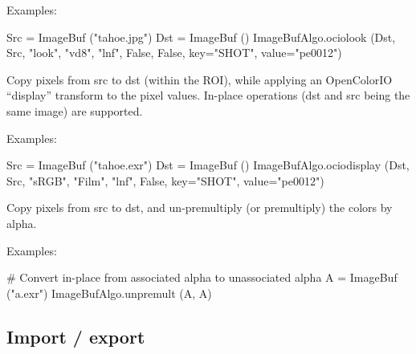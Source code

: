 \smallskip
\noindent Examples:
\begin{code}
    Src = ImageBuf ("tahoe.jpg")
    Dst = ImageBuf ()
    ImageBufAlgo.ociolook (Dst, Src, "look", "vd8", "lnf", False, False,
                            key="SHOT", value="pe0012")
\end{code}
\apiend


 
Copy pixels from {\cf src} to {\cf dst} (within the ROI), while
applying an OpenColorIO ``display'' transform to the pixel values.
In-place operations ({\cf dst} and {\cf src} being the same image)
are supported.

\smallskip
\noindent Examples:
\begin{code}
    Src = ImageBuf ("tahoe.exr")
    Dst = ImageBuf ()
    ImageBufAlgo.ociodisplay (Dst, Src, "sRGB", "Film", "lnf", False,
                              key="SHOT", value="pe0012")
\end{code}
\apiend


 
 
Copy pixels from {\cf src} to {\cf dst}, and un-premultiply (or
premultiply) the colors by alpha.

\smallskip
\noindent Examples:
\begin{code}
    # Convert in-place from associated alpha to unassociated alpha
    A = ImageBuf ("a.exr")
    ImageBufAlgo.unpremult (A, A)
\end{code}
\apiend



\subsection{Import / export}
\label{sec:iba:py:importexport}

 

